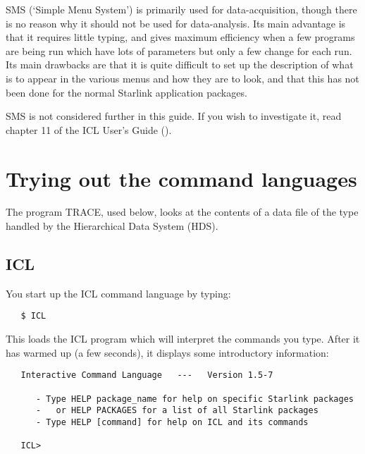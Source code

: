 SMS (`Simple Menu System') is primarily used for data-acquisition, though
there is no reason why it should not be used for data-analysis.
Its main advantage is that it requires little typing, and gives maximum 
efficiency when a few programs are being run which have lots of 
parameters but only a few change for each run.
Its main drawbacks are that it is quite difficult to set up the description of
what is to appear in the various menus and how they are to look, and that this
has not been done for the normal Starlink application packages.

SMS is not considered further in this guide.
If you wish to investigate it, read chapter 11 of the ICL User's Guide
().

\section{Trying out the command languages}
\label{S_trycl}

The program TRACE, used below, looks at the contents of a data file of the
type handled by the Hierarchical Data System (HDS).

\subsection{ICL}

You start up the ICL command language by typing:

\begin{small}
\begin{verbatim}
   $ ICL
\end{verbatim}
\end{small}

This loads the ICL program which will interpret the commands you type.
After it has warmed up (a few seconds), it displays some introductory
information:

\begin{small}
\begin{verbatim}
   Interactive Command Language   ---   Version 1.5-7

      - Type HELP package_name for help on specific Starlink packages
      -   or HELP PACKAGES for a list of all Starlink packages
      - Type HELP [command] for help on ICL and its commands

   ICL>
\end{verbatim}
\end{small}

